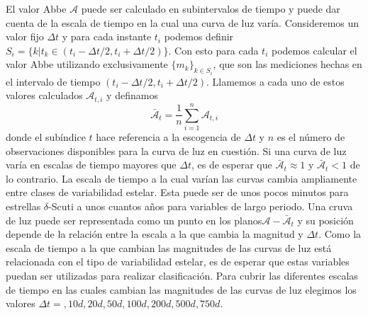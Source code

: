 \documentclass[letterpaper,12pt]{book}
\begin{document}
El valor Abbe $\mathcal{A}$ puede ser calculado en subintervalos de tiempo y puede dar cuenta de la escala de tiempo en la cual una curva de luz varía. Consideremos un valor fijo $\Delta t$ y para cada instante $t_i$ podemos definir $S_i = \{k|t_k\in(t_i-\Delta t/2, t_i + \Delta t/2)\}$. Con esto para cada $t_i$ podemos calcular el valor Abbe utilizando exclusivamente $\{m_k\}_{k\in S_i}$, que son las mediciones hechas en el intervalo de tiempo $(t_i-\Delta t/2, t_i + \Delta t/2)$. Llamemos a cada uno de estos valores calculados $\mathcal{A}_{t,i}$ y definamos
\begin{equation}
  \bar{\mathcal{A}}_t = \frac{1}{n}\sum_{i=1}^{n}\mathcal{A}_{t,i}
\end{equation}
donde el subíndice $t$ hace referencia a la escogencia de $\Delta t$ y $n$ es el número de observaciones disponibles para la curva de luz en cuestión. Si una curva de luz varía en escalas de tiempo mayores que $\Delta t$, es de esperar que $\bar{\mathcal{A}}_t\approx1$ y $\bar{\mathcal{A}}_t<1$ de lo contrario. La escala de tiempo a la cual varían las curvas cambia ampliamente entre clases de variabilidad estelar. Esta puede ser de unos pocos minutos para estrellas $\delta$-Scuti a unos cuantos años para variables de largo periodo. Una cruva de luz puede ser representada como un punto en los planos$\mathcal{A}-\bar{\mathcal{A}}_t$ y su posición depende de la relación entre la escala a la que cambia la magnitud y $\Delta t$. Como la escala de tiempo a la que cambian las magnitudes de las curvas de luz está relacionada con el tipo de variabilidad estelar, es de esperar que estas variables puedan ser utilizadas para realizar clasificación. Para cubrir las diferentes escalas de tiempo en las cuales cambian las magnitudes de las curvas de luz elegimos los valores $\Delta t = , 10d, 20d, 50d, 100d, 200d, 500d, 750d$. 
\end{document}
